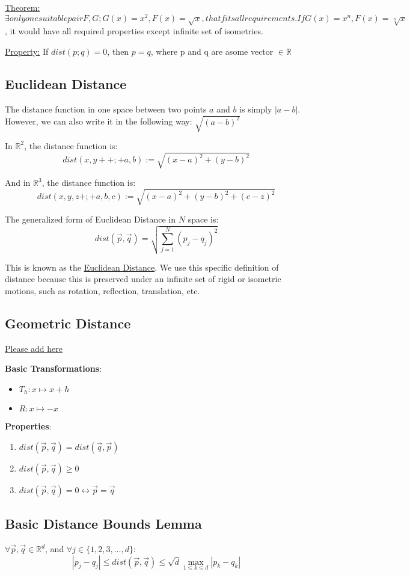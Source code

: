\underline{Theorem:} $\exists only one suitable pair F, G; G(x) = x^2, F(x) = \sqrt{x}, that fits all requirements. If G(x) = x^n, F(x) = \sqrt[n]{x}$, it would have all required properties except infinite set of isometries.

\underline{Property:} If $dist(p; q) = 0$, then $p = q$, where p and q are asome vector $\in \mathbb{R}$

\subsection{Euclidean Distance}
The distance function in one space between two points $a$ and $b$ is simply $|a
- b|$. However, we can also write it in the following way: $\sqrt{(a - b)^2}$

In $\mathbb{R}^2$, the distance function is:
$$dist(x, y++;+a,b) := \sqrt{(x - a)^2 + (y - b)^2}$$

And in $\mathbb{R}^3$, the distance function is:
$$dist(x, y, z+;+ a,b,c) := \sqrt{(x - a)^2 + (y - b)^2 + (c - z)^2}$$

The generalized form of Euclidean Distance in $N$ space is:
$$dist(\vec{p}, \vec{q}) = \sqrt{\sum_{j = 1}^N (p_j - q_j)^2}$$

This is known as the \underline{Euclidean Distance}. We use this specific
definition of distance because this is preserved under an infinite set of rigid
or isometric motions, such as rotation, reflection, translation, etc.

\subsection{Geometric Distance}
\underline{Please add here}

\textbf{Basic Transformations}:
\begin{itemize}
\item $T_h : x \mapsto x+h$
\item $R: x \mapsto -x$
\end{itemize}

\textbf{Properties}:
\begin{enumerate}
\item $dist(\vec{p}, \vec{q}) = dist(\vec{q}, \vec{p})$
\item $dist(\vec{p}, \vec{q}) \geq 0$
\item $dist(\vec{p}, \vec{q}) = 0 \leftrightarrow \vec{p} = \vec{q}$
\end{enumerate}

\subsection{Basic Distance Bounds Lemma}
$\forall \vec{p}, \vec{q} \in
\mathbb{R}^d$, and $\forall j \in \{1,2,3,\dots,d\}$:
$$|p_j - q_j| \leq dist(\vec{p}, \vec{q}) \leq \sqrt{d} \max_{1 \leq k \leq
d} |p_k - q_k|$$

